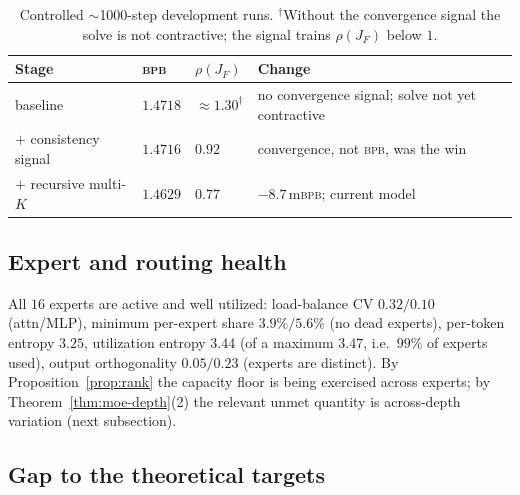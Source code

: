 \documentclass[11pt]{article}
\newcommand{\rhoF}{\rho(J_F)}
\newcommand{\bpb}{\textsc{bpb}}
\begin{document}
\begin{table}[H]
\centering
\small
\renewcommand{\arraystretch}{1.2}
\begin{tabular}{@{}lll L{0.46\textwidth}@{}}
\toprule
\textbf{Stage} & \textbf{\bpb} & \textbf{$\rhoF$} & \textbf{Change} \\
\midrule
baseline & $1.4718$ & $\approx1.30^\dagger$ & no convergence signal; solve not yet contractive \\
$+$ consistency signal & $1.4716$ & $0.92$ & convergence, not \bpb, was the win \\
$+$ recursive multi-$K$ & $\mathbf{1.4629}$ & $\mathbf{0.77}$ & $-8.7$\,m\bpb; current model \\
\bottomrule
\end{tabular}
\caption{Controlled $\sim$1000-step development runs.  $^\dagger$Without the convergence signal the
solve is not contractive; the signal trains $\rhoF$ below $1$.}
\label{tab:trajectory}
\end{table}

\subsection{Expert and routing health}
\label{sec:health}

All $16$ experts are active and well utilized: load-balance CV $0.32/0.10$ (attn/MLP), minimum
per-expert share $3.9\%/5.6\%$ (no dead experts), per-token entropy $3.25$, utilization entropy
$3.44$ (of a maximum $3.47$, i.e.\ $99\%$ of experts used), output orthogonality $0.05/0.23$ (experts
are distinct).  By Proposition~\ref{prop:rank} the capacity floor is being exercised across experts;
by Theorem~\ref{thm:moe-depth}(2) the relevant unmet quantity is across-depth variation
(next subsection).

\subsection{Gap to the theoretical targets}
\label{sec:gap}
\end{document}

